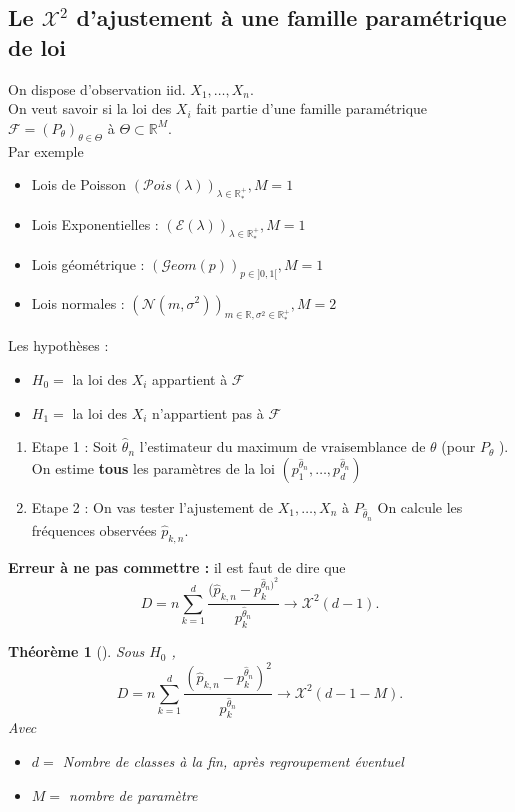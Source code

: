 \documentclass{article}
\theoremstyle{plain}%
\newtheorem{thm}{Théorème}[section]
\theoremstyle{definition}
\theoremstyle{remark}
\begin{document}
\subsection{Le $ \mathcal{X}^2 $ d'ajustement à une famille paramétrique de loi}
On dispose d'observation iid. $ X_1, \dots, X_n $. \\ 
On veut savoir si la loi des $ X_i $ fait partie d'une famille paramétrique $ \mathcal{F} =  (P_\theta )_{\theta \in \Theta} $ à $ \Theta \subset \mathbb{R}^M $.\\
Par exemple \begin{itemize}
    \item Lois de Poisson $ (\mathcal{P}ois(\lambda ))_{\lambda \in \mathbb{R}^+_*}, M=1 $ 
    \item Lois Exponentielles : $ (\mathcal{E}(\lambda ))_{\lambda \in \mathbb{R}^+_*}, M=1 $
    \item Lois géométrique : $ (\mathcal{G}eom(p))_{p \in ]0,1[}, M=1 $
    \item Lois normales : $ (\mathcal{N}(m, \sigma ^2))_{m \in \mathbb{R}, \sigma ^2 \in \mathbb{R}^+_*}, M=2 $
\end{itemize}
Les hypothèses :
\begin{itemize}
    \item $ H_0 = $ la loi des $ X_i $ appartient à $ \mathcal{F} $ 
    \item $ H_1 = $ la loi des $ X_i $ n'appartient pas à $ \mathcal{F} $ 
\end{itemize}
\begin{enumerate}
    \item Etape 1 : Soit $ \hat{\theta }_n $ l'estimateur du maximum de vraisemblance de $ \theta  $ (pour $ P_\theta  $ ). On estime \textbf{tous} les paramètres de la loi $ (p_1^{\hat{\theta }_n}, \dots, p_d^{\hat{\theta }_n}) $ 
    \item Etape 2 : On vas tester l'ajustement de $ X_1, \dots, X_n $ à $ P_{\hat{\theta }_n} $ On calcule les fréquences observées $ \hat{p}_{k,n} $.
\end{enumerate}
\textbf{Erreur à ne pas commettre :} il est faut de dire que 
\[
    D = n \sum_{k=1}^{d}\frac{(\hat{p}_{k,n} - p_k^{\hat{\theta }_n)^2}}{p_k^{\hat{\theta }_n}} \to \mathcal{X}^2(d-1)
.\]
\begin{thm}[]
    Sous $ H_0 $ , 
    \[
        D = n \sum_{k=1}^{d}\frac{(\hat{p}_{k,n} - p_k^{\hat{\theta}_n})^2}{p_k^{\hat{\theta }_n}} \to \mathcal{X}^2 (d-1-M)
    .\]
    Avec \begin{itemize}
        \item $ d= $ Nombre de classes à la fin, après regroupement éventuel
        \item $ M =  $ nombre de paramètre
    \end{itemize}
\end{thm}
\end{document}
